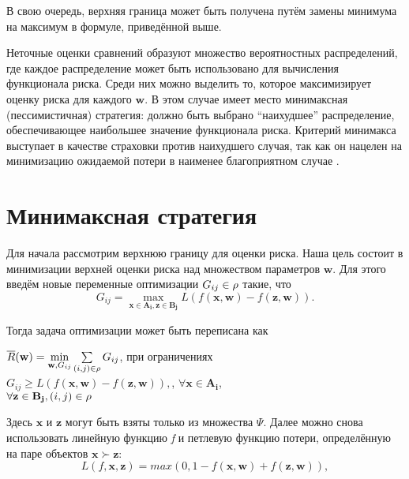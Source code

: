 \documentclass[12pt,a4paper,oneside]{article}
\begin{document}
\begin{multicols}{2}
\par
В свою очередь, верхняя граница может быть получена путём замены минимума на максимум в формуле, приведённой выше.

\par
Неточные оценки сравнений образуют множество вероятностных распределений, где каждое распределение может быть использовано для вычисления функционала риска.
Среди них можно выделить то, которое максимизирует оценку риска для каждого \(\mathbf{w}\).
В этом случае имеет место минимаксная (пессимистичная) стратегия: должно быть выбрано ``наихудшее'' распределение, обеспечивающее наибольшее значение функционала риска. 
Критерий минимакса выступает в качестве страховки против наихудшего случая, так как он нацелен на минимизацию ожидаемой потери в наименее благоприятном случае . 


\vspace*{1em}
\chapter{Минимаксная стратегия}

\par
Для начала рассмотрим верхнюю границу для оценки риска. 
Наша цель состоит в минимизации верхней оценки риска над множеством параметров \(\mathbf{w}\). 
Для этого введём новые переменные оптимизации \(G_{ij} \in \mathrm{\rho}\) такие, что
\[
G_{ij} = \underset{\mathbf{x} \in \mathbf{A_i}, \mathbf{z} \in \mathbf{B_j}}{\operatorname{max}} L (f (\mathbf{x}, \mathbf{w}) - f(\mathbf{z}, \mathbf{w})). 
\]

\par
Тогда задача оптимизации может быть переписана как
\begin{center}
\(\overline{R}(\mathbf{w}) = \underset{\mathbf{w}, G_{ij}}{\operatorname{min}} \sum \limits_{(i, j) \in \mathrm{\rho}} G_{ij}\), при ограничениях\\
\(G_{ij} \geq L (f(\mathbf{x}, \mathbf{w}) - f(\mathbf{z}, \mathbf{w})), 
\), \(\forall \mathbf{x} \in \mathbf{A_i}\),\\
\(\forall \mathbf{z} \in \mathbf{B_j}, (i, j) \in \mathrm{\rho}\)
\end{center}

\par
Здесь \(\mathbf{x}\) и \(\mathbf{z}\) могут быть взяты только из множества \(\Psi\). Далее можно снова использовать линейную функцию \emph{f} и петлевую функцию потери, определённую на паре объектов \(\mathbf{x} \succ \mathbf{z}\):
\[
L(f, \mathbf{x}, \mathbf{z}) = max (0,1 - f(\mathbf{x}, \mathbf{w}) + f(\mathbf{z}, \mathbf{w})),
\]


\end{multicols}
\end{document}
